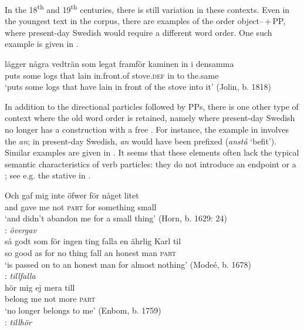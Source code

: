 \documentclass[output=paper]{langscibook}
\begin{document}
\begin{sloppypar}
In the 18\textsuperscript{th} and 19\textsuperscript{th} centuries, there is still variation in these contexts. Even in the youngest text in the corpus, there are examples of the order object–\,+\,PP, where present-day Swedish would require a different word order. One such example is given in .
\end{sloppypar}

\ea\label{ex:lalu:44}
\gll  lägger   några   vedträn   som   legat   framför       kaminen in       i     densamma\\
puts       some     logs     that     lain     in.front.of   stove.\textsc{def} in   to   the.same\\
\glt `puts some logs that have lain in front of the stove into it’ (Jolin, b. 1818)\\
\z


In addition to the directional particles followed by PPs, there is one other type of context where the old word order is retained, namely where present-day Swedish no longer has a construction with a free . For instance, the example in  involves the  \textit{an}; in present-day Swedish, \textit{an} would have been prefixed (\textit{anstå} ‘befit’). Similar examples are given in . It seems that these elements often lack the typical semantic characteristics of verb particles: they do not introduce an endpoint or a ; see e.g. the stative  in .


\ea\label{ex:lalu:45}
\ea\label{ex:lalu:45a}
\gll  Och   gaf   mig     inte     öfwer   för     någet       litet\\
    and     gave  me   not   \textsc{part}     for     something   small\\
\glt `and didn’t abandon me for a small thing’ (Horn, b. 1629: 24)\\
    : \textit{övergav}\\

\ex\label{ex:lalu:45b}
\gll  så    godt   som   för   ingen ting   falla   en  ährlig   Karl   til \\
    so     good   as     for   no thing     fall   an  honest   man   \textsc{part}\\
\glt ‘is passed on to an honest man for almost nothing’ (Modeé, b. 1678)\\
    : \textit{tillfalla} \\
\ex\label{ex:lalu:45c}
\gll hör       mig   ej     mera   till \\
    belong   me   not   more   \textsc{part}\\
\glt `no longer belongs to me’ (Enbom, b. 1759)\\
    : \textit{tillhör}\\
\z
\z
\end{document}
